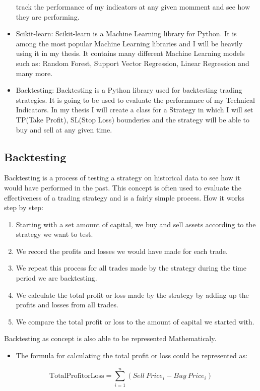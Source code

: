 \documentclass{imc-inf}
\begin{document}
\begin{itemize}
				track the performance of my indicators at any given momment and see how they are performing.
				\item Scikit-learn: Scikit-learn is a Machine Learning library for Python. It is among the most popular Machine Learning libraries and
				I will be heavily using it in my thesis. It contains many different Machine Learning models such as: Random Forest, Support Vector Regression, Linear Regression and many more.
				\item Backtesting: Backtesting is a Python library used for backtesting trading strategies. It is going to be used to evaluate the performance of my Technical Indicators.
				In my thesis I will create a class for a Strategy in which I will set TP(Take Profit), SL(Stop Loss) bounderies and the strategy will be able to buy and sell at any given time.
			\end{itemize}

		\subsection{Backtesting}
			Backtesting is a process of testing a strategy on historical data to see how it would have performed in the past. 
			This concept is often used to evaluate the effectiveness of a trading strategy and is a fairly simple process. 
			How it works step by step:
			\begin{enumerate}
				\item Starting with a set amount of capital, we buy and sell assets according to the strategy we want to test.
				\item We record the profits and losses we would have made for each trade.
				\item We repeat this process for all trades made by the strategy during the time period we are backtesting.
				\item We calculate the total profit or loss made by the strategy by adding up the profits and losses from all trades.
				\item We compare the total profit or loss to the amount of capital we started with.
			\end{enumerate}

			Backtesting as concept is also able to be represented Mathematicaly.

			\begin{itemize}
				\item The formula for calculating the total profit or loss could be represented as:
			\end{itemize}
			\begin{equation}
				\mathrm{Total Profit or Loss} = \sum_{i=1}^{n} (Sell\ Price_i - Buy\ Price_i)
			\end{equation}
\end{document}
